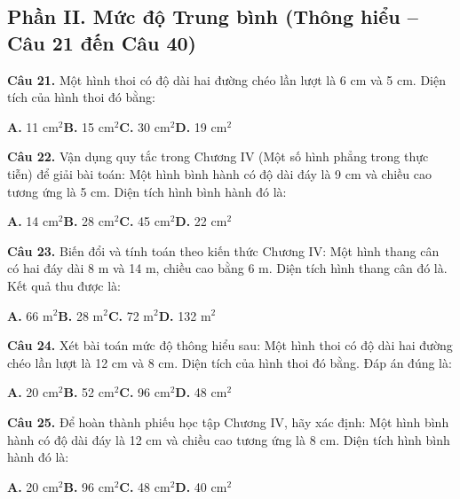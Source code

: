 \documentclass[11pt,a4paper]{article}
\begin{document}
\subsection*{\color{accent} Phần II. Mức độ Trung bình (Thông hiểu -- Câu 21 đến Câu 40)}
\textbf{\color{primary} Câu 21.} Một hình thoi có độ dài hai đường chéo lần lượt là 6 cm và 5 cm. Diện tích của hình thoi đó bằng:\par
\hspace*{1.5em}\textbf{A.} 11 cm$^2$\quad\quad \textbf{B.} 15 cm$^2$\quad\quad \textbf{C.} 30 cm$^2$\quad\quad \textbf{D.} 19 cm$^2$\par\vspace{2pt}
\textbf{\color{primary} Câu 22.} Vận dụng quy tắc trong Chương IV (Một số hình phẳng trong thực tiễn) để giải bài toán: Một hình bình hành có độ dài đáy là 9 cm và chiều cao tương ứng là 5 cm. Diện tích hình bình hành đó là:\par
\hspace*{1.5em}\textbf{A.} 14 cm$^2$\quad\quad \textbf{B.} 28 cm$^2$\quad\quad \textbf{C.} 45 cm$^2$\quad\quad \textbf{D.} 22 cm$^2$\par\vspace{2pt}
\textbf{\color{primary} Câu 23.} Biến đổi và tính toán theo kiến thức Chương IV: Một hình thang cân có hai đáy dài 8 m và 14 m, chiều cao bằng 6 m. Diện tích hình thang cân đó là. Kết quả thu được là:\par
\hspace*{1.5em}\textbf{A.} 66 m$^2$\quad\quad \textbf{B.} 28 m$^2$\quad\quad \textbf{C.} 72 m$^2$\quad\quad \textbf{D.} 132 m$^2$\par\vspace{2pt}
\textbf{\color{primary} Câu 24.} Xét bài toán mức độ thông hiểu sau: Một hình thoi có độ dài hai đường chéo lần lượt là 12 cm và 8 cm. Diện tích của hình thoi đó bằng. Đáp án đúng là:\par
\hspace*{1.5em}\textbf{A.} 20 cm$^2$\quad\quad \textbf{B.} 52 cm$^2$\quad\quad \textbf{C.} 96 cm$^2$\quad\quad \textbf{D.} 48 cm$^2$\par\vspace{2pt}
\textbf{\color{primary} Câu 25.} Để hoàn thành phiếu học tập Chương IV, hãy xác định: Một hình bình hành có độ dài đáy là 12 cm và chiều cao tương ứng là 8 cm. Diện tích hình bình hành đó là:\par
\hspace*{1.5em}\textbf{A.} 20 cm$^2$\quad\quad \textbf{B.} 96 cm$^2$\quad\quad \textbf{C.} 48 cm$^2$\quad\quad \textbf{D.} 40 cm$^2$\par\vspace{2pt}
\end{document}
